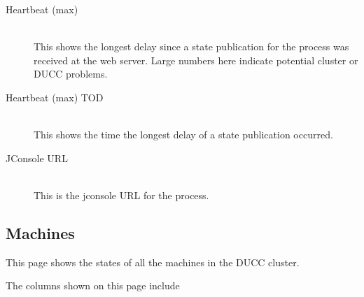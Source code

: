 \begin{description}
      \item[Heartbeat (max)] \hfill \\ 
        This shows the longest delay since a state publication for the process was received
        at the web server.  Large numbers here indicate potential cluster or DUCC problems.

      \item[Heartbeat (max) TOD] \hfill \\ 
        This shows the time the longest delay of a state publication occurred.

      \item[JConsole URL] \hfill \\ 
        This is the jconsole URL for the process.

   \end{description}
      
\subsection{Machines}

This page shows the states of all the machines in the DUCC cluster.

The columns shown on this page include

